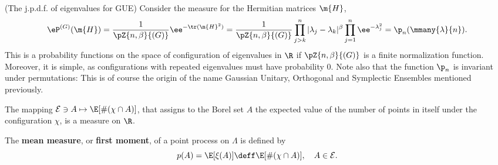 \begin{exemplo} (The j.p.d.f. of eigenvalues for GUE)
	Consider the measure for the Hermitian matrices $\m{H}$,
	\begin{equation}
		\eP^{(G)}(\m{H}) = \frac{1}{\pZ{n,\beta}{(G)}} \ee^{-\tr(\m{H}^2)} = \frac{1}{\pZ{n,\beta}{(G)}} \prod_{j>k}^n |\lambda_j - \lambda_k|^\beta \prod_{j=1}^{n} \ee^{- \lambda_j^2} = \p_n(\mmany{\lambda}{n}).
	\end{equation}
	This is a probability functions on the space of configuration of eigenvalues in $\R$ if $\pZ{n,\beta}{(G)}$ is a finite normalization function. Moreover, it is simple, as configurations with repeated eigenvalues must have probability $0$. Note also that the function $\p_n$ is invariant under permutations: This is of course the origin of the name Gaussian Unitary, Orthogonal and Symplectic Ensembles mentioned previously.
\end{exemplo}

The mapping $\mathcal{E} \ni A \mapsto \E[\#(\chi \cap A)]$, that assigns to the Borel set $A$ the expected value of the number of points in itself under the configuration $\chi$, is a measure on $\R$. 

\begin{definicao}
	The \textbf{mean measure}, or \textbf{first moment}, of a point process on $\Lambda$ is defined by 
	\begin{equation}
		p(A) = \E[\xi(A)] \deff \E[\#(\chi \cap A)], \quad A \in \mathcal{E}.
	\end{equation}
\end{definicao}

